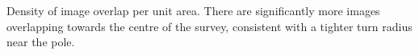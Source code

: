 \label{fig:LCdensity} Density of image overlap per unit area. There are significantly more images overlapping towards the centre of the survey, consistent with a tighter turn radius near the pole.